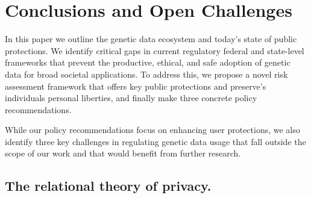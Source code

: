 \section{Conclusions and  Open Challenges}
\label{section:challenges}

In this paper we outline the genetic data ecosystem and today's state of public protections. We identify critical gaps in current regulatory federal and state-level frameworks that prevent the productive, ethical, and safe adoption of genetic data for broad societal applications. To address this, we propose a novel risk assessment framework that offers key public protections and preserve's individuals personal liberties, and finally make three concrete policy recommendations. 


While our policy recommendations focus on enhancing user protections, we also identify three key challenges in regulating genetic data usage that fall outside the scope of our work and that would benefit from further research.

\subsection{The relational theory of privacy.}

